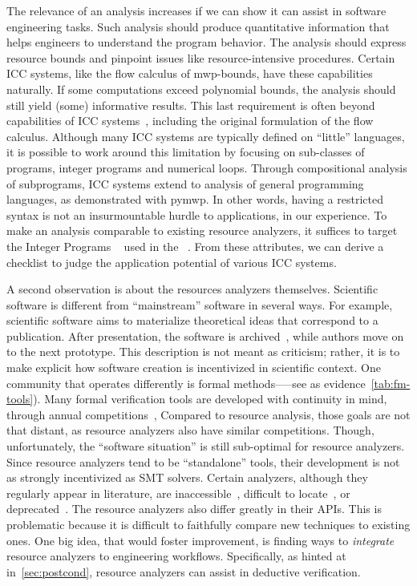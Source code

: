 The relevance of an analysis increases if we can show it can assist in software engineering tasks.
Such analysis should produce quantitative information that helps engineers to understand the program behavior.
The analysis should express resource bounds and pinpoint issues like resource-intensive procedures.
Certain ICC systems, like the flow calculus of mwp-bounds, have these capabilities naturally.
If some computations exceed polynomial bounds, the analysis should still yield (some) informative results.
This last requirement is often beyond capabilities of ICC systems~\cite{baillot2012}, including the original formulation of the flow calculus.
Although many ICC systems are typically defined on \enquote{little} languages, it is possible to work around this limitation by focusing on sub-classes of programs, \eg integer programs and numerical loops.
Through compositional analysis of subprograms, ICC systems extend to analysis of general programming languages, as demonstrated with pymwp.
In other words, having a restricted syntax is not an insurmountable hurdle to applications, in our experience.
To make an analysis comparable to existing resource analyzers, it suffices to target the  Integer Programs ~\cite{cinteger} used in the ~\cite{giesl2019}.
From these attributes, we can derive a checklist to judge the application potential of various ICC systems.

A second observation is about the resources analyzers themselves.
Scientific software is different from \enquote{mainstream} software in several ways.
For example, scientific software aims to materialize theoretical ideas that correspond to a publication.
After presentation, the software is archived~\cite{acm_badging}, while authors move on to the next prototype.
This description is not meant as criticism;
rather, it is to make explicit how software creation is incentivized in scientific context.
One community that operates differently is formal methods—--see as evidence~\autoref{tab:fm-tools}).
Many formal verification tools are developed with continuity in mind, through annual competitions~\cite{casc,beyer2022}, \etc
Compared to resource analysis, those goals are not that distant, as resource analyzers also have similar competitions.
Though, unfortunately, the \enquote{software situation} is still sub-optimal for resource analyzers.
Since resource analyzers tend to be \enquote{standalone} tools, their development is not as strongly incentivized as \eg SMT solvers.
Certain analyzers, although they regularly appear in literature, are inaccessible~\cite{sinn2017}, difficult to locate~\cite{carbonneaux2015},
or deprecated~\cite{gulwani2009,srikanth2017}.
The resource analyzers also differ greatly in their APIs.
This is problematic because it is difficult to faithfully compare new techniques to existing ones.
One big idea, that would foster improvement, is finding ways to \emph{integrate} resource analyzers to engineering workflows.
Specifically, as hinted at in~\autoref{sec:postcond}, resource analyzers can assist in deductive verification.

